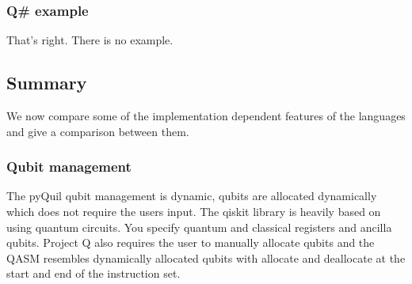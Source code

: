 \noindent \begin{minipage}[t]{0.6\textwidth}
\inputminted{python}{code/asm/text/progprojqhello.txt}
\end{minipage} \hfill 
\begin{minipage}[t]{0.37\textwidth}
\inputminted[lastline=29]{python}{code/asm/projqout.txt}
\inputminted[firstline=31]{python}{code/asm/projqout.txt}
\end{minipage}

\subsubsection{Q\# example}

That's right. There is no example.

\subsection{Summary}

We now compare some of the implementation dependent features of the languages and give a comparison between them.
\subsubsection{Qubit management}

The pyQuil qubit management is dynamic, qubits are allocated dynamically which does not require the users input. The qiskit library is heavily based on using quantum circuits. You specify quantum and classical registers and ancilla qubits. Project Q also requires the user to manually allocate qubits and the QASM resembles dynamically allocated qubits with allocate and deallocate at the start and end of the instruction set. 

